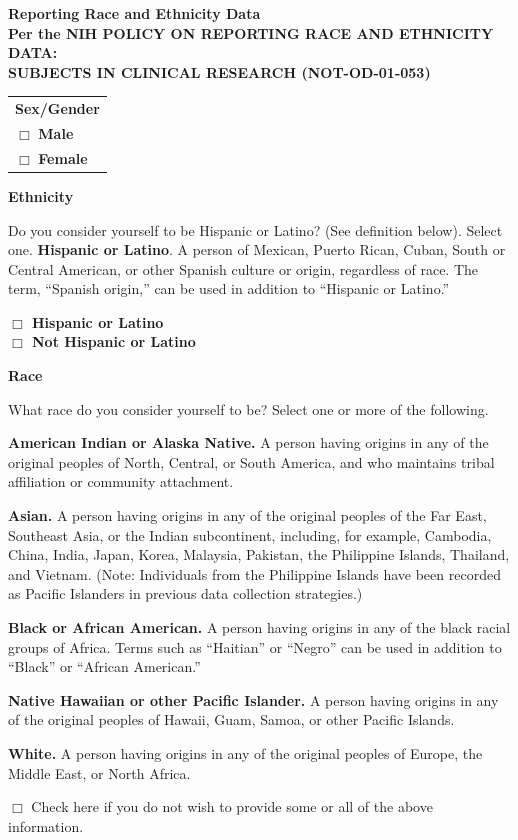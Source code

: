 \documentclass[11pt]{article}
\begin{document}
%
{%
\begin{center}
\textbf{Reporting Race and Ethnicity Data}\\

\textbf{Per the NIH POLICY ON REPORTING RACE AND ETHNICITY DATA:}\\
\textbf{SUBJECTS IN CLINICAL RESEARCH (NOT-OD-01-053)}

\setlength\extrarowheight{1pt}
\begin{tabular}{|m{1.5in}|}
\hline
\textbf{Sex/Gender} \\
$\Box$ \textbf{Male} \\
$\Box$ \textbf{Female} \\ \hline
\end{tabular}

\end{center}

\textbf{Ethnicity}

Do you consider yourself to be Hispanic or Latino? (See definition below). Select one.
\textbf{Hispanic or Latino}. A person of Mexican, Puerto Rican, Cuban, South or Central American,
or other Spanish culture or origin, regardless of race. The term, ``Spanish origin,''
can be used in addition to ``Hispanic or Latino.''

\hspace*{.4in}\textbf{$\Box$ Hispanic or Latino}\\
\hspace*{.4in}\textbf{$\Box$ Not Hispanic or Latino}

\textbf{Race}

What race do you consider yourself to be? Select one or more of the following.
\vspace{-11pt}\begin{compactitem}[$\Box$]
    \item \textbf{American Indian or Alaska Native.} A person having origins in any of the original
        peoples of North, Central, or South America, and who maintains tribal affiliation or community attachment.
    \item \textbf{Asian.} A person having origins in any of the original peoples of the Far East, Southeast
        Asia, or the Indian subcontinent, including, for example, Cambodia, China, India, Japan, Korea, Malaysia, Pakistan,
        the Philippine Islands, Thailand, and Vietnam. (Note: Individuals from the Philippine Islands have been recorded
        as Pacific Islanders in previous data collection strategies.)
    \item \textbf{Black or African American.} A person having origins in any of the black racial groups of
        Africa. Terms such as ``Haitian'' or ``Negro'' can be used in addition to ``Black'' or ``African American.''
    \item \textbf{Native Hawaiian or other Pacific Islander.} A person having origins in
        any of the original peoples of Hawaii, Guam, Samoa, or other Pacific Islands.
    \item\textbf{White.} A person having origins in any of the original peoples of Europe, the Middle East, or North Africa.
\end{compactitem}

\vspace{-11pt}$\Box$ Check here if you do not wish to provide some or all of the above information.
}%
{}%

\label{LastPage}
\end{document}
